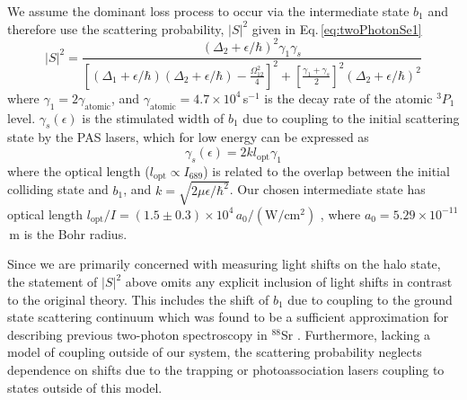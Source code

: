 We assume the dominant loss process to occur via the intermediate state $b_1$ and therefore use the scattering probability, $\vert S \vert^2 $ given in Eq.\,\ref{eq:twoPhotonSe1} 
\begin{equation} \label{eq:4sprob}
	\vert  S \vert^2 = \frac{(\Delta_2 + \epsilon/\hbar)^2 \gamma_1 \gamma_s}{
  	\left[ (\Delta_1+\epsilon/\hbar) (\Delta_2+\epsilon/\hbar)-\frac{\Omega_{12}^{2}}{4}\right]^2 + \left[ \frac{\gamma_1 + \gamma_s}{2}\right]^2 (\Delta_2+\epsilon/\hbar)^2}
\end{equation}
where ${\gamma}_{1}=2\gamma_{\text{atomic}}$, and $\gamma_{\text{atomic}}=4.7\times 10^4$\,s$^{-1}$ is the decay rate of the atomic $^3P_1$ level.
${\gamma}_{s}(\epsilon)$ is the stimulated width of $b_1$ due to coupling to the initial scattering state by the PAS lasers, which for low energy can be expressed as \cite{fks96,Bohn1996,Napolitano1994,bav00,Bohn1999}
\begin{equation} \label{equationstimulatedwidth}
	{\gamma}_{s}(\epsilon)=2k l_{\text{opt}} \gamma_1
\end{equation}
where the optical length ($l_{\text{opt}}\propto I_{689}$) is related to the overlap between the initial colliding state and $b_1$, and $k=\sqrt{2\mu \epsilon/ \hbar^2}$.
Our chosen intermediate state has optical length $l_{\text{opt}}/I=(1.5\pm0.3)\times 10^4\,a_0\mathrm{/(W/cm^2)}$ \cite{Borkowski2014a}, where $a_0=5.29\times 10^{-11}$\,m is the Bohr radius.

Since we are primarily concerned with measuring light shifts on the halo state, the statement of $\vert S \vert^2$ above omits any explicit inclusion of light shifts in contrast to the original theory.
This includes the shift of $b_1$ due to coupling to the ground state scattering continuum which was found to be a sufficient approximation for describing previous two-photon spectroscopy in $^{88}$Sr \cite{MartinezDeEscobar2008}.
Furthermore, lacking a model of coupling outside of our system, the scattering probability neglects dependence on shifts due to the trapping or photoassociation lasers coupling to states outside of this model.

